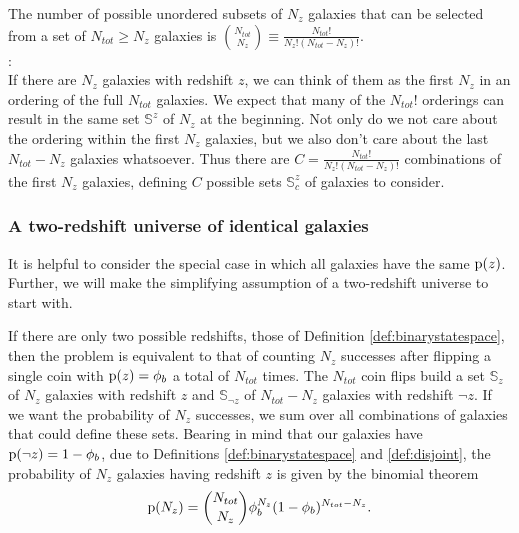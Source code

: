 \begin{lemma}\label{lem:combinations}
	The number of possible unordered subsets of $N_{z}$ galaxies that can be selected from a set of $N_{tot} \geq N_{z}$ galaxies is $\binom{N_{tot}}{N_{z}} \equiv \frac{N_{tot}!}{N_{z}! (N_{tot} - N_{z})!}$.\\
	:\\
	If there are $N_{z}$ galaxies with redshift $z$, we can think of them as the first $N_{z}$ in an ordering of the full $N_{tot}$ galaxies.
	We expect that many of the $N_{tot}!$ orderings can result in the same set $\mathbb{S}^{z}$ of $N_{z}$ at the beginning.
	Not only do we not care about the ordering within the first $N_{z}$ galaxies, but we also don't care about the last $N_{tot} - N_{z}$ galaxies whatsoever.
	Thus there are $C = \frac{N_{tot}!}{N_{z}! (N_{tot} - N_{z})!}$ combinations of the first $N_{z}$ galaxies, defining $C$ possible sets $\mathbb{S}^{z}_{c}$ of galaxies to consider.
\end{lemma}


\subsubsection{A two-redshift universe of identical galaxies}

It is helpful to consider the special case in which all galaxies have the same \pzpdf $\mathrm{p}(z)$.
Further, we will make the simplifying assumption of a two-redshift universe to start with.

\begin{theorem}
If there are only two possible redshifts, those of Definition \ref{def:binarystatespace}, then the problem is equivalent to that of counting $N_{z}$ successes after flipping a single coin with $\mathrm{p}(z) = \phi_{b}$ a total of $N_{tot}$ times.
The $N_{tot}$ coin flips build a set $\mathbb{S}_{z}$ of $N_{z}$ galaxies with redshift $z$ and $\mathbb{S}_{\lnot z}$ of $N_{tot} - N_{z}$ galaxies with redshift $\lnot z$.
If we want the probability of $N_{z}$ successes, we sum over all combinations of galaxies that could define these sets.
Bearing in mind that our galaxies have $\mathrm{p}(\lnot z) = 1 - \phi_{b}$, due to Definitions \ref{def:binarystatespace} and \ref{def:disjoint}, the probability of $N_{z}$ galaxies having redshift $z$ is given by the binomial theorem
\begin{equation}
\eqlabel{eq:binomial}
\pr{N_{z}} = \binom{N_{tot}}{N_{z}} \phi_{b}^{N_{z}} (1 - \phi_{b})^{N_{tot} - N_{z}} .
\end{equation}
\end{theorem}

